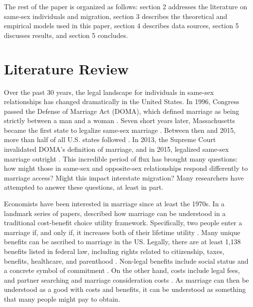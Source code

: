 \documentclass[12pt,letterpaper]{article}
\begin{document}
The rest of the paper is organized as follows: section 2 addresses the literature on same-sex individuals and migration, section 3 describes the theoretical and empirical models used in this paper, section 4 describes data sources, section 5 discusses results, and section 5 concludes.

\section{Literature Review}
Over the past 30 years, the legal landscape for individuals in same-sex relationships has changed dramatically in the United States. In 1996, Congress passed the Defense of Marriage Act (DOMA), which defined marriage as being strictly between a man and a woman \citep{5}. Seven short years later, Massachusetts became the first state to legalize same-sex marriage \citep{1, 3, 5}. Between then and 2015, more than half of all U.S. states followed \citep{12}. In 2013, the Supreme Court invalidated DOMA’s definition of marriage, and in 2015, legalized same-sex marriage outright \citep{1, 3, 5, 12}. This incredible period of flux has brought many questions: how might those in same-sex and opposite-sex relationships respond differently to marriage access? Might this impact interstate migration? Many researchers have attempted to answer these questions, at least in part.

Economists have been interested in marriage since at least the 1970s. In a landmark series of papers, \citet{9} described how marriage can be understood in a traditional cost-benefit choice utility framework. Specifically, two people enter a marriage if, and only if, it increases both of their lifetime utility \citep{9}. Many unique benefits can be ascribed to marriage in the US. Legally, there are at least 1,138 benefits listed in federal law, including rights related to citizenship, taxes, benefits, healthcare, and parenthood \citep{1, 8}. Non-legal benefits include social status and a concrete symbol of commitment \citep{8}. On the other hand, costs include legal fees, and partner searching and marriage consideration costs \citep{9}. As marriage can then be understood as a good with costs and benefits, it can be understood as something that many people might pay to obtain. 
\end{document}
